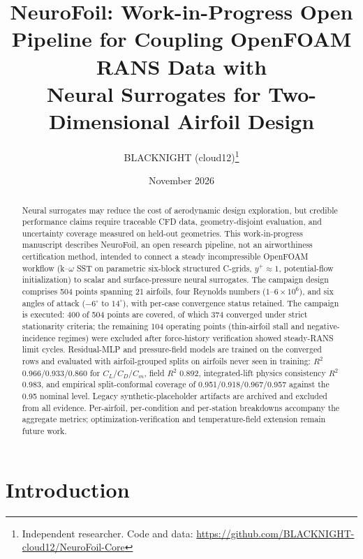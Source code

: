 \documentclass[11pt]{article}
\title{NeuroFoil: Work-in-Progress Open Pipeline for Coupling OpenFOAM RANS Data with\\
Neural Surrogates for Two-Dimensional Airfoil Design}
\author{%
  BLACKNIGHT (cloud12)\thanks{Independent researcher. Code and data:
  \url{https://github.com/BLACKNIGHT-cloud12/NeuroFoil-Core}}%
}
\date{November 2026}
\begin{document}
\maketitle

\begin{abstract}
Neural surrogates may reduce the cost of aerodynamic design exploration, but
credible performance claims require traceable CFD data, geometry-disjoint
evaluation, and uncertainty coverage measured on held-out geometries. This
work-in-progress manuscript describes NeuroFoil, an open research pipeline, not
an airworthiness certification method, intended to connect a steady
incompressible OpenFOAM workflow (k--$\omega$ SST on parametric
six-block structured C-grids, $y^+ \approx 1$, potential-flow initialization)
to scalar and surface-pressure neural surrogates. The campaign design comprises
504 points spanning 21 airfoils, four Reynolds numbers ($1$--$6\times10^6$), and
six angles of attack ($-6^\circ$ to $14^\circ$), with per-case convergence status
retained. The campaign is executed: 400 of 504 points are covered, of which 374
converged under strict stationarity criteria; the remaining 104 operating points
(thin-airfoil stall and negative-incidence regimes) were excluded after force-history
verification showed steady-RANS limit cycles. Residual-MLP and pressure-field
models are trained on the converged rows and evaluated with airfoil-grouped
splits on airfoils never seen in training: $R^2$ 0.966/0.933/0.860 for
$C_L/C_D/C_m$, field $R^2$ 0.892, integrated-lift physics consistency $R^2$ 0.983,
and empirical split-conformal coverage of 0.951/0.918/0.967/0.957 against the
0.95 nominal level. Legacy synthetic-placeholder artifacts are archived and
excluded from all evidence. Per-airfoil, per-condition and per-station
breakdowns accompany the aggregate metrics; optimization-verification and
temperature-field extension remain future work.
\end{abstract}

\section{Introduction}
\label{sec:intro}
\end{document}
